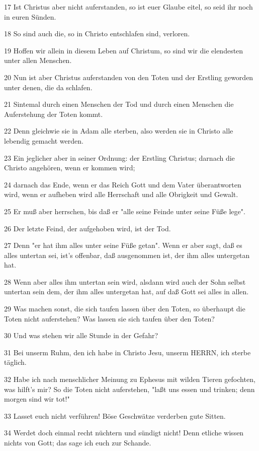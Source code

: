 \par 17 Ist Christus aber nicht auferstanden, so ist euer Glaube eitel, so seid ihr noch in euren Sünden.
\par 18 So sind auch die, so in Christo entschlafen sind, verloren.
\par 19 Hoffen wir allein in diesem Leben auf Christum, so sind wir die elendesten unter allen Menschen.
\par 20 Nun ist aber Christus auferstanden von den Toten und der Erstling geworden unter denen, die da schlafen.
\par 21 Sintemal durch einen Menschen der Tod und durch einen Menschen die Auferstehung der Toten kommt.
\par 22 Denn gleichwie sie in Adam alle sterben, also werden sie in Christo alle lebendig gemacht werden.
\par 23 Ein jeglicher aber in seiner Ordnung: der Erstling Christus; darnach die Christo angehören, wenn er kommen wird;
\par 24 darnach das Ende, wenn er das Reich Gott und dem Vater überantworten wird, wenn er aufheben wird alle Herrschaft und alle Obrigkeit und Gewalt.
\par 25 Er muß aber herrschen, bis daß er "alle seine Feinde unter seine Füße lege".
\par 26 Der letzte Feind, der aufgehoben wird, ist der Tod.
\par 27 Denn "er hat ihm alles unter seine Füße getan". Wenn er aber sagt, daß es alles untertan sei, ist's offenbar, daß ausgenommen ist, der ihm alles untergetan hat.
\par 28 Wenn aber alles ihm untertan sein wird, alsdann wird auch der Sohn selbst untertan sein dem, der ihm alles untergetan hat, auf daß Gott sei alles in allen.
\par 29 Was machen sonst, die sich taufen lassen über den Toten, so überhaupt die Toten nicht auferstehen? Was lassen sie sich taufen über den Toten?
\par 30 Und was stehen wir alle Stunde in der Gefahr?
\par 31 Bei unserm Ruhm, den ich habe in Christo Jesu, unserm HERRN, ich sterbe täglich.
\par 32 Habe ich nach menschlicher Meinung zu Ephesus mit wilden Tieren gefochten, was hilft's mir? So die Toten nicht auferstehen, "laßt uns essen und trinken; denn morgen sind wir tot!"
\par 33 Lasset euch nicht verführen! Böse Geschwätze verderben gute Sitten.
\par 34 Werdet doch einmal recht nüchtern und sündigt nicht! Denn etliche wissen nichts von Gott; das sage ich euch zur Schande.
